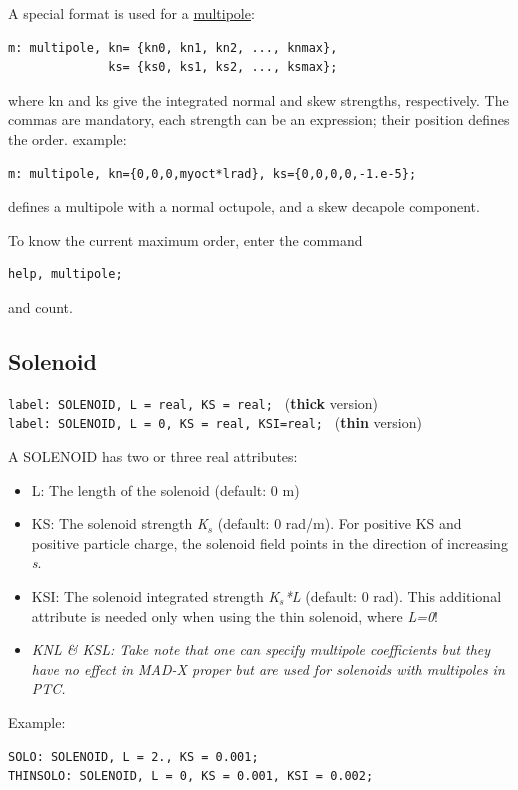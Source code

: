 A special format is used for a \href{multipole.html}{multipole}: 
\begin{verbatim}
m: multipole, kn= {kn0, kn1, kn2, ..., knmax},
              ks= {ks0, ks1, ks2, ..., ksmax};
\end{verbatim} 
where kn and ks give the integrated normal and skew strengths,
respectively. The commas are mandatory, each strength can be an
expression; their position defines the order. example:  
\begin{verbatim}
m: multipole, kn={0,0,0,myoct*lrad}, ks={0,0,0,0,-1.e-5};
\end{verbatim} 
defines a multipole with a normal octupole, and a skew decapole component. 

To know the current maximum order, enter the command 
\begin{verbatim}
help, multipole;
\end{verbatim} 
and count.

%
\subsection{Solenoid}
\label{sec:solenoid}

\texttt{label: SOLENOID, L = real, KS = real;           } (\textbf{thick} version) 
\\
\texttt{label: SOLENOID, L = 0,    KS = real, KSI=real; } (\textbf{thin} version) 

A SOLENOID has two or three real attributes: 
\begin{itemize}
   \item L: The length of the solenoid (default: 0 m) 
   \item KS: The solenoid strength \textit{K$_s$} (default: 0
     rad/m). For positive KS and positive particle charge, the solenoid
     field points in the direction of increasing \textit{s}.  
   \item KSI: The solenoid integrated strength \textit{K$_s$*L}
     (default: 0 rad).  This additional attribute is needed only when
     using the thin solenoid,  where \textit{L=0}!     
   \item \textit{ KNL \& KSL:  Take note that one can specify multipole
     coefficients but they have no effect in MAD-X proper but are used
     for solenoids with multipoles in PTC.} 
\end{itemize}

Example: 
\begin{verbatim}
SOLO: SOLENOID, L = 2., KS = 0.001;
THINSOLO: SOLENOID, L = 0, KS = 0.001, KSI = 0.002;
\end{verbatim}

